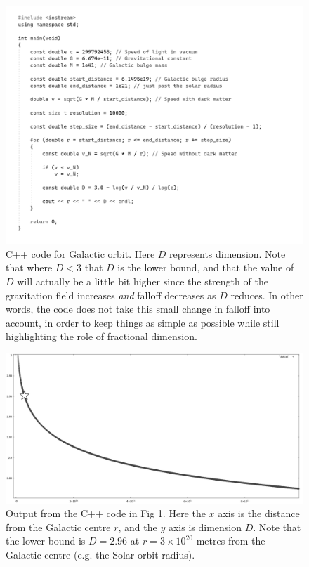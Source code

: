 \documentclass[12pt]{article}
\begin{document}
\begin{figure} 
\centering
  \includegraphics[width = 5 in]{code.png}
  \caption{ C++ code for Galactic orbit. 
Here $D$ represents dimension.
Note that where $D < 3$ that $D$ is the lower bound, and that the value of $D$ will actually be a little bit higher since the strength of the gravitation field increases {\textit{and}} falloff decreases as $D$ reduces.
In other words, the code does not take this small change in falloff into account, in order to keep things as simple as possible while still highlighting the role of fractional dimension.
}
\end{figure}


\begin{figure} 
\centering
  \includegraphics[width = 5 in]{dimension_graph.png}
  \caption{ Output from the C++ code in Fig 1.
Here the $x$ axis is the distance from the Galactic centre $r$, and the $y$ axis is dimension $D$.
Note that the lower bound is $D = 2.96$ at $r = 3 \times 10^{20}$ metres from the Galactic centre (e.g. the Solar orbit radius).
}
\end{figure}
\end{document}
